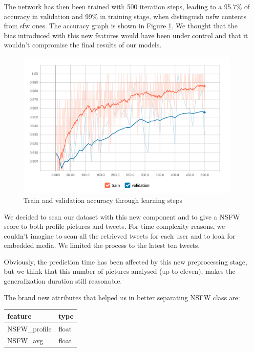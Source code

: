 The network has then been trained with 500 iteration steps, leading to a  95.7\% of accuracy in validation and 99\% in training stage, when distinguish nsfw contents from sfw ones. The accuracy graph is shown in Figure \ref{fig:inception}.
We thought that the bias introduced with this new features would have been under control and that it wouldn't compromise the final results of our models.

\begin{figure}[htp!]
	\centering
	\includegraphics[width=\columnwidth]{chapter4/figure/inception.jpg}
	\caption{Train and validation accuracy through learning steps}
	\label{fig:inception}
\end{figure}

We decided to scan our dataset with this new component and to give a NSFW score to both profile pictures and tweets.
For time complexity reasons, we couldn't imagine to scan all the retrieved tweets for each user and to look for embedded media. We limited the process to the latest ten tweets.

Obviously, the prediction time has been affected by this new preprocessing stage, but we think that this number of pictures analysed (up to eleven), makes the generalization duration still reasonable.

The brand new attributes that helped us in better separating NSFW class are:
\small
\begin{center}
	\begin{tabular}{ll}
		\\feature&type\\
		\hline\hline
		NSFW\_profile&float\\
		NSFW\_avg&float\\\hline
	\end{tabular}
\end{center}
\normalsize


